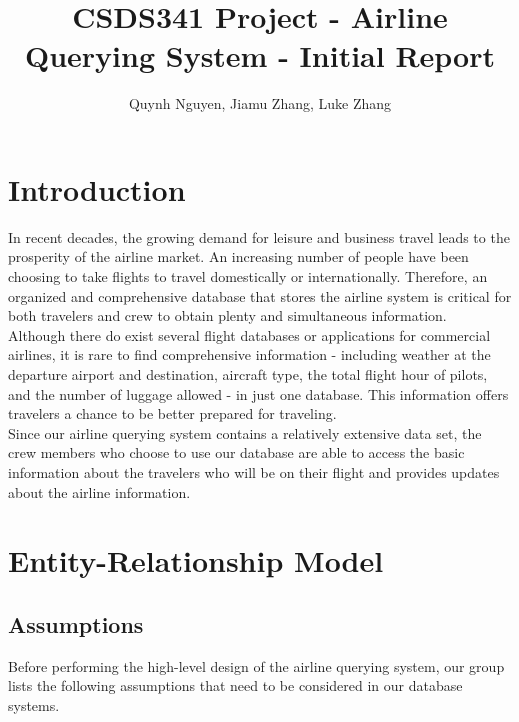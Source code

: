 \documentclass{article}
\title{CSDS341 Project - Airline Querying System - Initial Report}
\author{Quynh Nguyen, Jiamu Zhang, Luke Zhang}
\begin{document}
	
	
	\maketitle
	
	\section{Introduction}
	
	\noindent In recent decades, the growing demand for leisure and business travel leads to the prosperity of the airline market. An increasing number of people have been choosing to take flights to travel domestically or internationally. Therefore, an organized and comprehensive database that stores the airline system is critical for both travelers and crew to obtain plenty and simultaneous information.\\
	
	\noindent Although there do exist several flight databases or applications for commercial airlines, it is rare to find comprehensive information - including weather at the departure airport and destination, aircraft type, the total flight hour of pilots, and the number of luggage allowed - in just one database. This information offers travelers a chance to be better prepared for traveling.\\
	
	\noindent Since our airline querying system contains a relatively extensive data set, the crew members who choose to use our database are able to access the basic information about the travelers who will be on their flight and provides updates about the airline information. 
	
	\section{Entity-Relationship Model}
	
	\subsection{Assumptions}
	{Before performing the high-level design of the airline querying system, our group lists the following assumptions that need to be considered in our database systems.}
	
\end{document}
